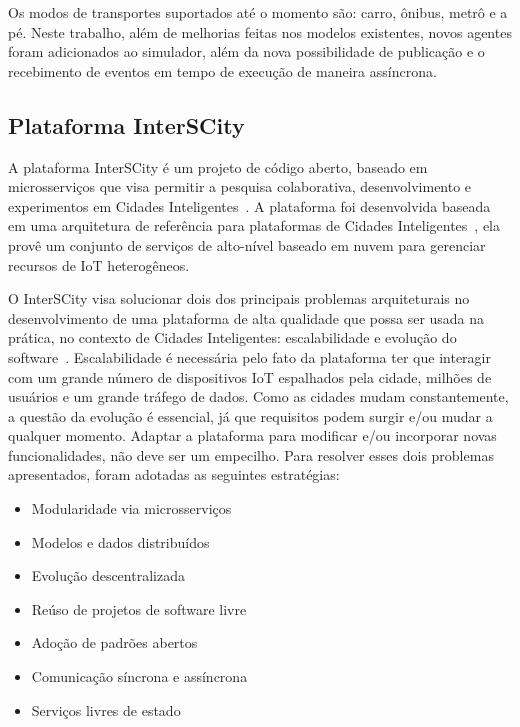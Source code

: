 Os modos de transportes suportados até o momento são: carro, ônibus, metrô e a pé.
Neste trabalho, além de melhorias feitas nos modelos existentes, novos agentes foram adicionados ao simulador, além da nova possibilidade de publicação e o recebimento de
eventos em tempo de execução de maneira assíncrona.

\subsection{Plataforma InterSCity}
\label{sec:interscity}

A plataforma InterSCity é um projeto de código aberto, baseado em microsserviços que visa permitir a pesquisa colaborativa, desenvolvimento e experimentos em Cidades
Inteligentes~\citep{arthur_17}.
A plataforma foi desenvolvida baseada em uma arquitetura de referência para plataformas de Cidades Inteligentes~\citep{santana_2016}, ela provê um conjunto de serviços de
alto-nível baseado em nuvem para gerenciar recursos de IoT heterogêneos.

O InterSCity visa solucionar dois dos principais problemas arquiteturais no desenvolvimento de uma plataforma de alta qualidade que possa ser usada na prática, no
contexto de Cidades Inteligentes: escalabilidade e evolução do software~\citep{arthur_17}.
Escalabilidade é necessária pelo fato da plataforma ter que interagir com um grande número de dispositivos IoT espalhados pela cidade, milhões de usuários e
um grande tráfego de dados.
Como as cidades mudam constantemente, a questão da evolução é essencial, já que requisitos podem surgir e/ou mudar a qualquer momento.
Adaptar a plataforma para modificar e/ou incorporar novas funcionalidades, não deve ser um empecilho.
Para resolver esses dois problemas apresentados, foram adotadas as seguintes estratégias:

\begin{itemize}
	\item Modularidade via microsserviços
	\item Modelos e dados distribuídos
	\item Evolução descentralizada
	\item Reúso de projetos de software livre
	\item Adoção de padrões abertos
	\item Comunicação síncrona e assíncrona
	\item Serviços livres de estado
\end{itemize}

